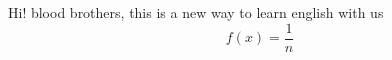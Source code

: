 Hi! blood brothers, this is a new way to learn english with us
\begin{equation}
    f(x) = \frac{1}{n}
\end{equation}